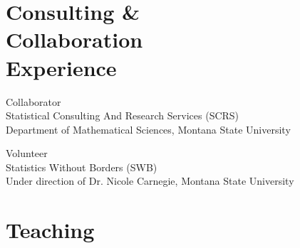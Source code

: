 \documentclass{wm_cv}
\begin{document}






\section{Consulting \& \\ Collaboration \\ Experience}

Collaborator \hfill {} \\ 
    \indent \quad Statistical Consulting And Research Services (SCRS) \\
   \indent \quad Department of Mathematical Sciences, Montana State University

Volunteer \hfill {} \\ 
    \indent \quad Statistics Without Borders (SWB) \\
   \indent \quad Under direction of Dr. Nicole Carnegie, Montana State University


\section{Teaching}
\end{document}
